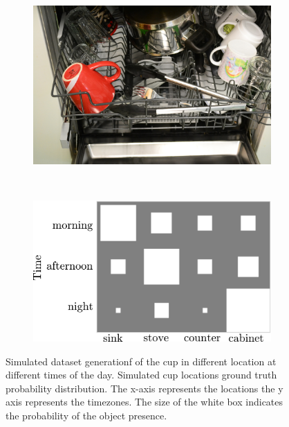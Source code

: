 \begin{figure}
    \centering
    \begin{subfigure}[b]{0.4\textwidth}
        \includegraphics[width=\textwidth]{images/cup_dishwasher.jpg}
        \caption{}
        \label{fig:eval_cup}
    \end{subfigure}
    ~ %
    \begin{subfigure}[b]{0.5\textwidth}
        \includegraphics[width=\textwidth]{images/eval_ground_truth.png}
        \caption{}
        \label{fig:eval_gt}
    \end{subfigure}
    \caption[Model Validation dataset generation]{Simulated dataset generationf of the cup in different location at different times of the day. Simulated cup locations ground truth probability distribution.
The x-axis represents the locations the y axis represents the timezones. The size of the white box indicates the probability of the object presence.}
\label{}
\end{figure}


